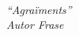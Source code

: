 \phantom{aaa}
\vspace{6em}\
\begin{flushright}
	\textit{
	``Agraïments''\\
	Autor Frase
	}
\end{flushright}
